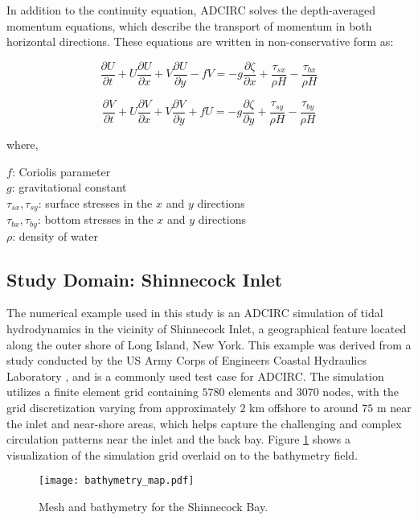 \documentclass[draft]{agujournal2019}
\begin{document}
In addition to the continuity equation, ADCIRC solves the depth-averaged momentum equations, which describe the transport of momentum in both horizontal directions. These equations are written in non-conservative form as:

\begin{equation} \frac{\partial{U}}{\partial{t}} + U \frac{\partial{U}}{\partial{x}} + V \frac{\partial{U}}{\partial{y}} - fV=-g \frac{\partial{\zeta}}{\partial{x}} + \frac{\tau_{sx}}{\rho H} - \frac{\tau_{bx}}{\rho H} \label{eq:2DSW2
} \end{equation}

\begin{equation} \frac{\partial{V}}{\partial{t}} + U \frac{\partial{V}}{\partial{x}} + V \frac{\partial{V}}{\partial{y}} + fU=-g \frac{\partial{\zeta}}{\partial{y}} + \frac{\tau_{sy}}{\rho H} - \frac{\tau_{by}}{\rho H} \label{eq:2DSW3
} \end{equation}

\noindent where,

\noindent$f$: Coriolis parameter\\
$g$: gravitational constant\\
$\tau_{sx}, \tau_{sy}$: surface stresses in the $x$ and $y$ directions\\
$\tau_{bx}, \tau_{by}$: bottom stresses in the $x$ and $y$ directions\\
$\rho$: density of water


\subsection{Study Domain: Shinnecock Inlet}
The numerical example used in this study is an ADCIRC simulation of tidal hydrodynamics in the vicinity of Shinnecock Inlet, a geographical feature located along the outer shore of Long Island, New York. This example was derived from a study conducted by the US Army Corps of Engineers Coastal Hydraulics Laboratory \cite{morang1999shinnecock, militello2001shinnecock}, and is a commonly used test case for ADCIRC. The simulation utilizes a finite element grid containing $5780$ elements and $3070$ nodes, with the grid discretization varying from approximately $2$ km offshore to around $75$ m near the inlet and near-shore areas, which helps capture the challenging and complex circulation patterns near the inlet and the back bay. Figure \ref{fig:bathy} shows a visualization of the simulation grid overlaid on to the bathymetry field. 

\begin{figure}[h]
    \centering    \texttt{[image: bathymetry\_map.pdf]}
    \caption{Mesh and bathymetry for the Shinnecock Bay.}
    \label{fig:bathy}
\end{figure}
\end{document}
